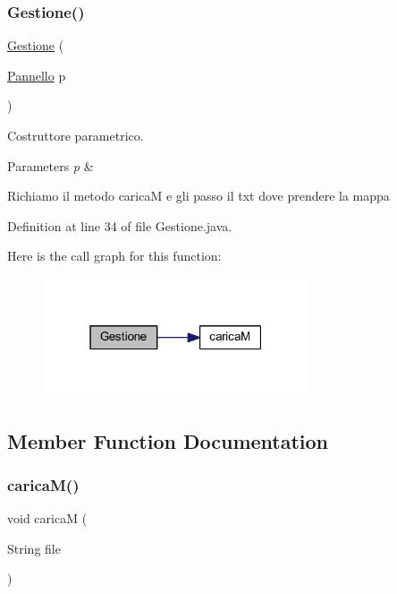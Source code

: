 \subsubsection{\texorpdfstring{Gestione()}{Gestione()}}
{\footnotesize\ttfamily \hyperlink{classblocchi_1_1_gestione}{Gestione} (\begin{DoxyParamCaption}\item[{\hyperlink{classa_1_1survival_1_1game_1_1_pannello}{Pannello}}]{p }\end{DoxyParamCaption})}



Costruttore parametrico. 


\begin{DoxyParams}{Parameters}
{\em p} & \\
\hline
\end{DoxyParams}
Richiamo il metodo caricaM e gli passo il txt dove prendere la mappa 

Definition at line 34 of file Gestione.\+java.

Here is the call graph for this function\+:
\nopagebreak
\begin{figure}[H]
\begin{center}
\leavevmode
\includegraphics[width=223pt]{classblocchi_1_1_gestione_a5bc02f9cbad6e4f5c1a061b599a9f5da_cgraph}
\end{center}
\end{figure}


\subsection{Member Function Documentation}
\mbox{\label{classblocchi_1_1_gestione_a373d83d9b42d31e72ccc982a3fd85ea9}} 
\subsubsection{\texorpdfstring{carica\+M()}{caricaM()}}
{\footnotesize\ttfamily void caricaM (\begin{DoxyParamCaption}\item[{String}]{file }\end{DoxyParamCaption})}




